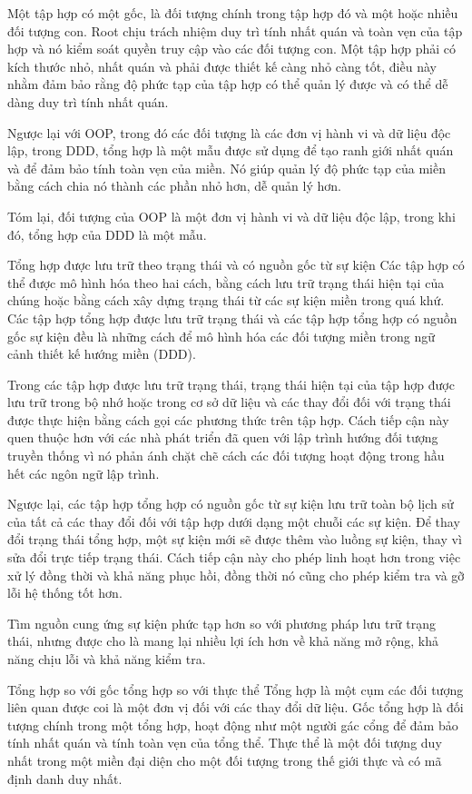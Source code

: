 Một tập hợp có một gốc, là đối tượng chính trong tập hợp đó và một hoặc nhiều đối tượng con. Root chịu trách nhiệm duy trì tính nhất quán và toàn vẹn của tập hợp và nó kiểm soát quyền truy cập vào các đối tượng con. Một tập hợp phải có kích thước nhỏ, nhất quán và phải được thiết kế càng nhỏ càng tốt, điều này nhằm đảm bảo rằng độ phức tạp của tập hợp có thể quản lý được và có thể dễ dàng duy trì tính nhất quán.

Ngược lại với OOP, trong đó các đối tượng là các đơn vị hành vi và dữ liệu độc lập, trong DDD, tổng hợp là một mẫu được sử dụng để tạo ranh giới nhất quán và để đảm bảo tính toàn vẹn của miền. Nó giúp quản lý độ phức tạp của miền bằng cách chia nó thành các phần nhỏ hơn, dễ quản lý hơn.

Tóm lại, đối tượng của OOP là một đơn vị hành vi và dữ liệu độc lập, trong khi đó, tổng hợp của DDD là một mẫu.

Tổng hợp được lưu trữ theo trạng thái và có nguồn gốc từ sự kiện
Các tập hợp có thể được mô hình hóa theo hai cách, bằng cách lưu trữ trạng thái hiện tại của chúng hoặc bằng cách xây dựng trạng thái từ các sự kiện miền trong quá khứ. Các tập hợp tổng hợp được lưu trữ trạng thái và các tập hợp tổng hợp có nguồn gốc sự kiện đều là những cách để mô hình hóa các đối tượng miền trong ngữ cảnh thiết kế hướng miền (DDD).

Trong các tập hợp được lưu trữ trạng thái, trạng thái hiện tại của tập hợp được lưu trữ trong bộ nhớ hoặc trong cơ sở dữ liệu và các thay đổi đối với trạng thái được thực hiện bằng cách gọi các phương thức trên tập hợp. Cách tiếp cận này quen thuộc hơn với các nhà phát triển đã quen với lập trình hướng đối tượng truyền thống vì nó phản ánh chặt chẽ cách các đối tượng hoạt động trong hầu hết các ngôn ngữ lập trình.

Ngược lại, các tập hợp tổng hợp có nguồn gốc từ sự kiện lưu trữ toàn bộ lịch sử của tất cả các thay đổi đối với tập hợp dưới dạng một chuỗi các sự kiện. Để thay đổi trạng thái tổng hợp, một sự kiện mới sẽ được thêm vào luồng sự kiện, thay vì sửa đổi trực tiếp trạng thái. Cách tiếp cận này cho phép linh hoạt hơn trong việc xử lý đồng thời và khả năng phục hồi, đồng thời nó cũng cho phép kiểm tra và gỡ lỗi hệ thống tốt hơn.

Tìm nguồn cung ứng sự kiện phức tạp hơn so với phương pháp lưu trữ trạng thái, nhưng được cho là mang lại nhiều lợi ích hơn về khả năng mở rộng, khả năng chịu lỗi và khả năng kiểm tra.

Tổng hợp so với gốc tổng hợp so với thực thể
Tổng hợp là một cụm các đối tượng liên quan được coi là một đơn vị đối với các thay đổi dữ liệu. Gốc tổng hợp là đối tượng chính trong một tổng hợp, hoạt động như một người gác cổng để đảm bảo tính nhất quán và tính toàn vẹn của tổng thể. Thực thể là một đối tượng duy nhất trong một miền đại diện cho một đối tượng trong thế giới thực và có mã định danh duy nhất.

